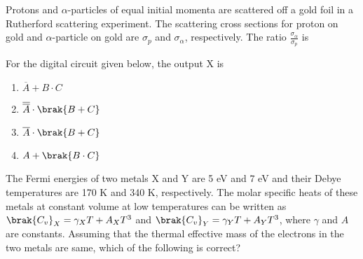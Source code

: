     \item Protons and $\alpha$-particles of equal initial momenta are scattered off a gold foil in a Rutherford scattering experiment. The scattering cross sections for proton on gold and  
 $\alpha$-particle on gold are $\sigma_p$ and $\sigma_{\alpha}$, respectively. The ratio  
 $\frac{\sigma_{\alpha}}{\sigma_p}$ is \underline{\hspace{2cm}}

 \item For the digital circuit given below, the output X is

    \begin{figure}[!ht]
\centering
{}%

\label{fig:my_label}
\end{figure}

    \begin{enumerate}
        \item $\overline{A} + B \cdot C$
        \item $\overline{\overline{A}} \cdot \brak{B + C}$
        \item $\overline{A} \cdot \brak{B + C}$
        \item $A + \brak{B \cdot C}$
    \end{enumerate}

    \item The Fermi energies of two metals X and Y are 5 eV and 7 eV and their Debye temperatures are 170 K and 340 K, respectively. The molar specific heats of these metals at constant volume at low temperatures can be written as $\brak{C_v}_X = \gamma_X T + A_X T^3$ and $\brak{C_v}_Y = \gamma_Y T + A_Y T^3$, where $\gamma$ and $A$ are constants. Assuming that the thermal effective mass of the electrons in the two metals are same, which of  
 the following is correct?


